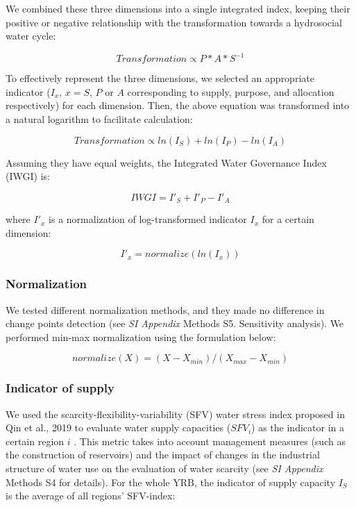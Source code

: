 \documentclass[9pt, twocolumn, twoside, lineno]{pnas-new}
\begin{document}
{\begin{itemize}
	\end{itemize}
	
	We combined these three dimensions into a single integrated index, keeping their positive or negative relationship with the transformation towards a hydrosocial water cycle: 
	
	$$ Transformation \propto P*A*S^{-1}$$

	To effectively represent the three dimensions, we selected an appropriate indicator ($I_x$, $x=S$, $P$ or $A$ corresponding to supply, purpose, and allocation respectively) for each dimension. Then, the above equation was transformed into a natural logarithm to facilitate calculation:

	$$ Transformation \propto ln(I_S) + ln(I_P) - ln(I_A) $$

	Assuming they have equal weights, the Integrated Water Governance Index (IWGI) is:

	$$ IWGI = I'_S + I'_P - I'_A $$

	where $I'_x$ is a normalization of log-transformed indicator $I_x$ for a certain dimension:

	$$ I'_x = normalize(ln(I_x)) $$
	
	\subsubsection*{Normalization}
	We tested different normalization methods, and they made no difference in change points detection (see \textit{SI Appendix} Methods S5. Sensitivity analysis). We performed min-max normalization using the formulation below:

	$$ normalize(X) = (X - X_{min}) / (X_{max} - X_{min}) $$

	\subsubsection*{Indicator of supply}
	We used the scarcity-flexibility-variability (SFV) water stress index proposed in Qin et al., 2019 to evaluate water supply capacities ($SFV_i$) as the indicator in a certain region $i$ \cite{qinFlexibilityintensityglobal2019}. This metric takes into account management measures (such as the construction of reservoirs) and the impact of changes in the industrial structure of water use on the evaluation of water scarcity (see \textit{SI Appendix} Methods S4 for details). For the whole YRB, the indicator of supply capacity $I_S$ is the average of all regions' SFV-index: 

}
\end{document}
